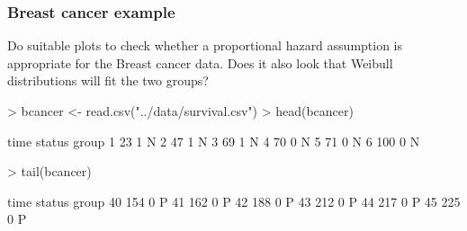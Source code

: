 \documentclass{beamer}
\newcounter{example}
\newcommand{\examp}{\refstepcounter{example}
       { \textbf{Example 8.\arabic{example}.}\ }}
\begin{document}

\begin{frame}[fragile] \frametitle{ Breast cancer example }

Do suitable plots to check whether a proportional hazard assumption is
appropriate for the Breast cancer data.  Does it also look that Weibull
distributions will fit the two groups?

\end{frame}

\begin{frame}[fragile] 
\begin{scriptsize}
\begin{Schunk}
\begin{Sinput}
> bcancer <- read.csv("../data/survival.csv")
> head(bcancer)
\end{Sinput}
\begin{Soutput}
  time status group
1   23      1     N
2   47      1     N
3   69      1     N
4   70      0     N
5   71      0     N
6  100      0     N
\end{Soutput}
\begin{Sinput}
> tail(bcancer)
\end{Sinput}
\begin{Soutput}
   time status group
40  154      0     P
41  162      0     P
42  188      0     P
43  212      0     P
44  217      0     P
45  225      0     P
\end{Soutput}

\end{Schunk}
\end{scriptsize}
\end{frame}
\end{document}
